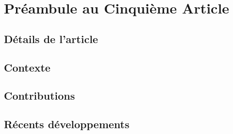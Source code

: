 \chapter{Pr\'{e}ambule au Cinqui\`{e}me Article }

\section{D\'{e}tails de l'article}

\section{Contexte}

\section{Contributions}

\section{R\'{e}cents d\'{e}veloppements}

